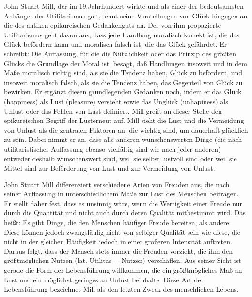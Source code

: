 John Stuart Mill, der im 19.Jahrhundert wirkte und als einer der bedeutsamsten Anhänger des Utilitarismus galt, lehnt seine Vorstellungen von Glück hingegen an die des antiken epikureischen Gedankenguts an. 
Der von ihm propagierte Utilitarismus geht davon aus, dass jede Handlung moralisch korrekt ist, die das Glück befördern kann und moralisch falsch ist, die das Glück gefährdet. 
Er schreibt: \glqq Die Auffassung, für die die Nützlichkeit oder das Prinzip des größten Glücks die Grundlage der Moral ist, besagt, daß Handlungen insoweit und in dem Maße moralisch richtig sind, als sie die Tendenz haben, Glück zu befördern, und insoweit moralisch falsch, als sie die Tendenz haben, das Gegenteil von Glück zu bewirken.\grqq{}\cite{JM94, S.13}
Er ergänzt diesen grundlegenden Gedanken noch, indem er das Glück (happiness) als Lust (pleasure) versteht sowie das Unglück (unhapiness) als Unlust oder das Fehlen von Lust definiert. 
Mill greift an dieser Stelle den epikureischen Begriff der \glqq Lust\grqq erneut auf. 
Mill sieht die Lust und die Vermeidung von Unlust als die zentralen Faktoren an, die wichtig sind, um dauerhaft glücklich zu sein. 
Dabei nimmt er an, dass \glqq alle anderen wünschenswerten Dinge (die nach utilitaristischer Auffassung ebenso vielfältig sind wie nach jeder anderen) entweder deshalb wünschenswert sind, weil sie selbst lustvoll sind oder weil sie Mittel sind zur Beförderung von Lust und zur Vermeidung von Unlust.\grqq{}\cite{JM94, S.13}

John Stuart Mill differenziert verschiedene Arten von Freuden aus, die nach seiner Auffassung in unterschiedlichem Maße zur Lust des Menschen beitragen. 
Er stellt daher fest, dass es unsinnig wäre, wenn die Wertigkeit einer Freude nur durch die Quantität und nicht auch durch deren Qualität mitbestimmt wird\cite{JM94, S.15}. 
Das heißt: Es gibt Dinge, die den Menschen häufiger Freude bereiten, als andere. 
Diese können jedoch zwangsläufig nicht von selbiger Qualität sein wie diese, die nicht in der gleichen Häufigkeit jedoch in einer größeren Intensität auftreten. 
Daraus folgt, dass der Mensch stets immer die Freuden vorzieht, die ihm den größtmöglichen Nutzen (lat. Utilitas = Nutzen) verschaffen. 
Aus seiner Sicht ist gerade die Form der Lebensführung willkommen, die ein größtmögliches Maß an Lust und ein möglichst geringes an Unlust beinhalte. 
Diese Art der Lebensführung bezeichnet Mill als den letzten Zweck des menschlichen Lebens\cite{JM94, S.21}.


